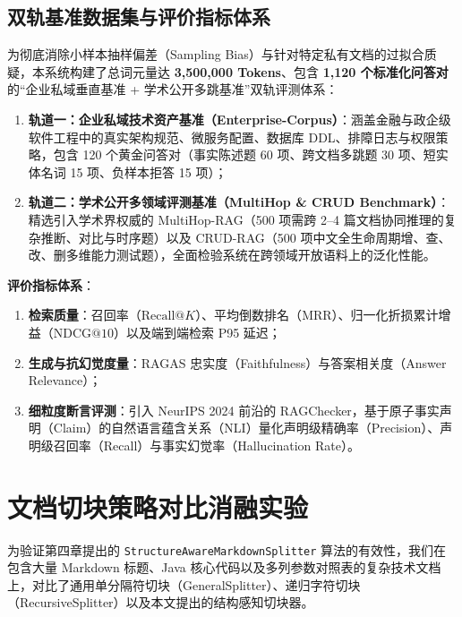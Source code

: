\subsection{双轨基准数据集与评价指标体系}
为彻底消除小样本抽样偏差（Sampling Bias）与针对特定私有文档的过拟合质疑，本系统构建了总词元量达 \textbf{3,500,000 Tokens}、包含 \textbf{1,120 个标准化问答对}的“企业私域垂直基准 + 学术公开多跳基准”双轨评测体系：
\begin{enumerate}
    \item \textbf{轨道一：企业私域技术资产基准（Enterprise-Corpus）}：涵盖金融与政企级软件工程中的真实架构规范、微服务配置、数据库 DDL、排障日志与权限策略，包含 120 个黄金问答对（事实陈述题 60 项、跨文档多跳题 30 项、短实体名词 15 项、负样本拒答 15 项）；
    \item \textbf{轨道二：学术公开多领域评测基准（MultiHop \& CRUD Benchmark）}：精选引入学术界权威的 MultiHop-RAG\cite{Tang2024MultiHopRAG}（500 项需跨 2--4 篇文档协同推理的复杂推断、对比与时序题）以及 CRUD-RAG\cite{Bao2024CRUDRAG}（500 项中文全生命周期增、查、改、删多维能力测试题），全面检验系统在跨领域开放语料上的泛化性能。
\end{enumerate}

\textbf{评价指标体系}：
\begin{enumerate}
    \item \textbf{检索质量}：召回率（$\text{Recall}@K$）、平均倒数排名（$\text{MRR}$）、归一化折损累计增益（$\text{NDCG}@10$）以及端到端检索 P95 延迟；
    \item \textbf{生成与抗幻觉度量}：RAGAS\cite{Es2023RAGAS} 忠实度（Faithfulness）与答案相关度（Answer Relevance）；
    \item \textbf{细粒度断言评测}：引入 NeurIPS 2024 前沿的 RAGChecker\cite{Ru2024RAGChecker}，基于原子事实声明（Claim）的自然语言蕴含关系（NLI）量化声明级精确率（Precision）、声明级召回率（Recall）与事实幻觉率（Hallucination Rate）。
\end{enumerate}

\section{文档切块策略对比消融实验}

为验证第四章提出的 \texttt{StructureAwareMarkdownSplitter} 算法的有效性，我们在包含大量 Markdown 标题、Java 核心代码以及多列参数对照表的复杂技术文档上，对比了通用单分隔符切块（GeneralSplitter）、递归字符切块（RecursiveSplitter）以及本文提出的结构感知切块器。

